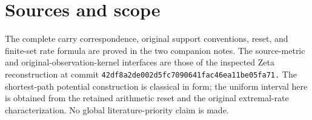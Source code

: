 \section{Sources and scope}\label{n05-sources-and-scope}

The complete carry correspondence, original support conventions, reset, and finite-set rate formula are proved in the two companion notes. The source-metric and original-observation-kernel interfaces are those of the inspected Zeta reconstruction at commit \nolinkurl{42df8a2de002d5fc7090641fac46ea11be05fa71.} The shortest-path potential construction is classical in form; the uniform interval here is obtained from the retained arithmetic reset and the original extremal-rate characterization. No global literature-priority claim is made.
